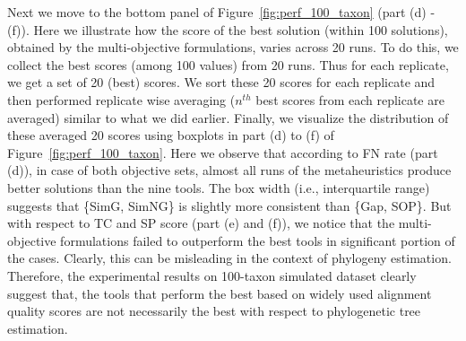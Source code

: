 Next we move to the bottom panel of Figure~\ref{fig:perf_100_taxon} (part (d) - (f)). Here we illustrate how the score of the best solution (within 100 solutions), obtained by the multi-objective formulations, varies across 20 runs. To do this, we collect the best scores (among 100 values) from 20 runs. Thus for each replicate, we get a set of 20 (best) scores. We sort these 20 scores for each replicate and then performed replicate wise averaging ($n^{th}$ best scores from each replicate are averaged) similar to what we did earlier. 
Finally, we visualize the distribution of these averaged 20 scores using boxplots in part (d) to (f) of Figure~\ref{fig:perf_100_taxon}. Here we observe that according to FN rate (part (d)), in case of both objective sets, almost all runs of the metaheuristics produce better solutions than the nine tools. 
The box width (i.e., interquartile range) suggests that \{SimG, SimNG\} is slightly more consistent than \{Gap, SOP\}. But with respect to TC and SP score (part (e) and (f)), we notice that the multi-objective formulations failed to outperform the best tools in significant portion of the cases. Clearly, this can be misleading in the context of phylogeny estimation. Therefore, the experimental results on 100-taxon simulated dataset clearly suggest that, the tools that perform the best based on widely used alignment quality scores are not necessarily the best with respect to phylogenetic tree estimation.

